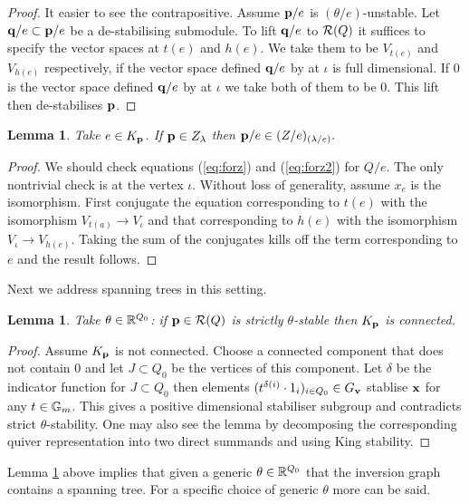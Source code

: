 \documentclass{amsart}
\newtheorem{lem}[thm]{Lemma}
\theoremstyle{definition}
\begin{document}
\begin{proof}
It easier to see the contrapositive.
Assume $\mathbf{p}/e$ is $(\theta/e)$-unstable.
Let $\mathbf{q}/e \subset \mathbf{p}/e$ be a de-stabilising submodule.
To lift $\mathbf{q}/e$ to $\mathcal{R}(Q)$ it suffices to specify the vector spaces at $t(e)$ and $h(e)$.
We take them to be $V_{t(e)}$ and $V_{h(e)}$ respectively, if the vector space defined $\mathbf{q}/e$ by at $\iota$ is full dimensional.
If $0$ is the vector space defined $\mathbf{q}/e$ by at $\iota$ we take both of them to be 0.
This lift then de-stabilises $\mathbf{p}$.
\end{proof}

\begin{lem}
Take $e \in K_{\mathbf{p}}$. If $\mathbf{p} \in Z_\lambda$ then $\mathbf{p}/e \in (Z/e)_{(\lambda/e)}.$
\end{lem}

\begin{proof}
We should check equations (\ref{eq:forz}) and (\ref{eq:forz2}) for $Q/e$.
The only nontrivial check is at the vertex $\iota$.
Without loss of generality, assume $x_e$ is the isomorphism.
First conjugate the equation corresponding to $t(e)$ with the isomorphism $V_{t(a)} \rightarrow V_\iota$ and that corresponding to $h(e)$ with the isomorphism $V_\iota \rightarrow V_{h(e)}$.
Taking the sum of the conjugates kills off the term corresponding to $e$ and the result follows.
\end{proof}

Next we address spanning trees in this setting.

\begin{lem}\label{lm:coninvgr2}
Take $\theta \in \mathbb{R}^{Q_0}$: if $\mathbf{p} \in \mathcal{R}(Q)$ is strictly $\theta$-stable then $K_{\mathbf{p}}$ is connected.
\end{lem}

\begin{proof}
Assume $K_{\mathbf{p}}$ is not connected. Choose a connected component that does not contain $0$ and let $J \subset Q_0$ be the vertices of this component. 
Let $\delta$ be the indicator function for $J \subset Q_0$ then elements $(t^{\delta(i)}\cdot 1_i)_{i \in Q_0} \in  G_{\mathbf{v}}$ stablise $\mathbf{x}$ for any $t \in \mathbb{G}_m$.
This gives a positive dimensional stabiliser subgroup and contradicts strict $\theta$-stability.
One may also see the lemma by decomposing the corresponding quiver representation into two direct summands and using King stability.
\end{proof}

Lemma \ref{lm:coninvgr2} above implies that given a generic $\theta \in \mathbb{R}^{Q_0}$ that the inversion graph contains a spanning tree.
For a specific choice of generic $\theta$ more can be said.
\end{document}
